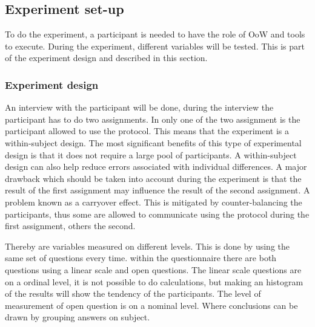 \subsection{Experiment set-up}
To do the experiment, a participant is needed to have the role of \acf{OoW} and tools to execute. During the experiment, different variables will be tested. This is part of the experiment design and described in this section.

\subsubsection{Experiment design}
An interview with the participant will be done, during the interview the participant has to do two assignments. In only one of the two assignment is the participant allowed to use the protocol. This means that the experiment is a within-subject design. The most significant benefits of this type of experimental design is that it does not require a large pool of participants. A within-subject design can also help reduce errors associated with individual differences. A major drawback which should be taken into account during the experiment is that the result of the first assignment may influence the result of the second assignment. A problem known as a carryover effect. This is mitigated by counter-balancing the participants, thus some are allowed to communicate using the protocol during the first assignment, others the second.

Thereby are variables measured on different levels. This is done by using the same set of questions every time. within the questionnaire there are both questions using a linear scale and open questions. The linear scale questions are on a ordinal level, it is not possible to do calculations, but making an histogram of the results will show the tendency of the participants. The level of measurement of open question is on a nominal level. Where conclusions can be drawn by grouping answers on subject. 

